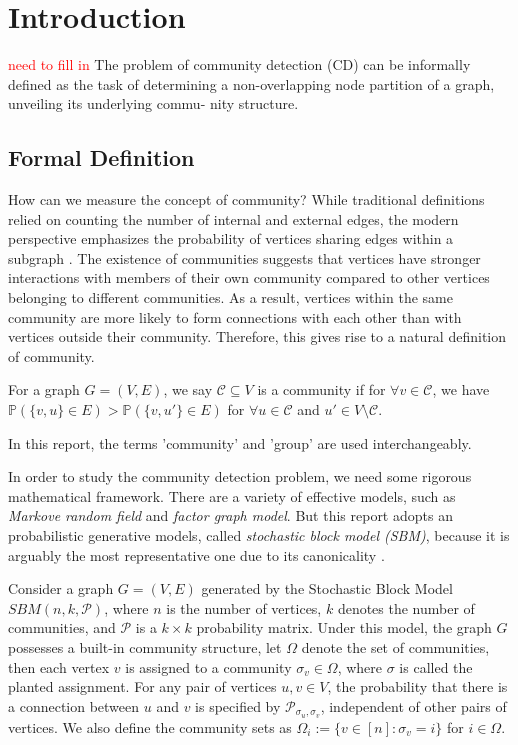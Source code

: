 \chapter{Introduction}
\textcolor{red}{need to fill in}
The problem of community detection (CD) can be informally defined as the task of determining a non-overlapping node partition of a graph, unveiling its underlying commu- nity structure.
\section{Formal Definition}
How can we measure the concept of community?  While traditional definitions relied on counting the number of internal and external edges, the modern perspective emphasizes the probability of vertices sharing edges within a subgraph \cite{userguide}. The existence of communities suggests that vertices have stronger interactions with members of their own community compared to other vertices belonging to different communities. As a result, vertices within the same community are more likely to form connections with each other than with vertices outside their community. Therefore, this gives rise to a natural definition of community.
\begin{definition}[Community]
   For a graph $G=(V,E)$, we say $\mathcal{C}\subseteq V$ is a community if for $\forall v\in \mathcal{C}$, we have $\mathbb{P}\left(\{v,u\}\in E\right)>\mathbb{P}\left(\{v,u'\}\in E\right)$ for $\forall u\in \mathcal{C}$ and $u'\in V\setminus \mathcal{C}$.
\end{definition}
\begin{remark}
    In this report, the terms 'community' and 'group' are used interchangeably.
\end{remark}
In order to study the community detection problem, we need some rigorous mathematical framework. There are a variety of effective models, such as \textit{Markove random field} and \textit{factor graph model}. But this report adopts an probabilistic generative models, called \textit{stochastic block model (SBM)}, because it is arguably the most representative one due to its canonicality \cite{Emmanuel2023} \cite{deeplearning}.
\begin{definition}
Consider a graph $G=(V, E)$ generated by the Stochastic Block Model $SBM(n, k, \mathcal{P})$, where $n$ is the number of vertices, $k$ denotes the number of communities, and $\mathcal{P}$ is a $k\times k$ probability matrix. Under this model, the graph $G$ possesses a built-in community structure, let $\Omega$ denote the set of communities, then each vertex $v$ is assigned to a community $\sigma_v\in\Omega$, where $\sigma$ is called the planted assignment. For any pair of vertices $u, v \in V$, the probability that there is a connection between $u$ and $v$ is specified by $\mathcal{P}_{\sigma_u, \sigma_v}$, independent of other pairs of vertices. We also define the community sets as $\Omega_i:=\{v\in[n]: \sigma_v=i\}$ for $i\in\Omega$.
\end{definition}
